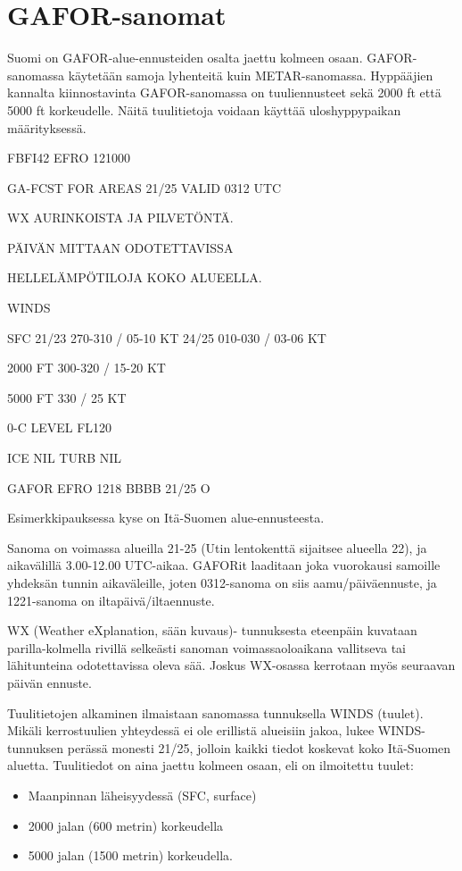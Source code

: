 \section{ GAFOR-sanomat }
\label{saaoppi-gafor-sanomat}


Suomi on GAFOR-alue-ennusteiden osalta jaettu kolmeen osaan. GAFOR-sanomassa käytetään samoja lyhenteitä kuin METAR-sanomassa. Hyppääjien kannalta kiinnostavinta GAFOR-sanomassa on tuuliennusteet sekä 2000 ft että 5000 ft korkeudelle. Näitä tuulitietoja voidaan käyttää uloshyppypaikan määrityksessä. 


FBFI42 EFRO 121000 


GA-FCST FOR AREAS 21/25 VALID 0312 UTC 


WX AURINKOISTA JA PILVETÖNTÄ. 


PÄIVÄN MITTAAN ODOTETTAVISSA 


HELLELÄMPÖTILOJA KOKO ALUEELLA. 


WINDS 


SFC 21/23 270-310 / 05-10 KT 24/25 010-030 / 03-06 KT 


2000 FT 300-320 / 15-20 KT 


5000 FT 330 / 25 KT 


0-C LEVEL FL120 


ICE NIL TURB NIL 


GAFOR EFRO 1218 BBBB 21/25 O 


Esimerkkipauksessa kyse on Itä-Suomen alue-ennusteesta. 


Sanoma on voimassa alueilla 21-25 (Utin lentokenttä sijaitsee alueella 22), ja aikavälillä 3.00-12.00 UTC-aikaa. GAFORit laaditaan joka vuorokausi samoille yhdeksän tunnin aikaväleille, joten 0312-sanoma on siis aamu/päiväennuste, ja 1221-sanoma on iltapäivä/iltaennuste. 


WX (Weather eXplanation, sään kuvaus)- tunnuksesta eteenpäin kuvataan parilla-kolmella rivillä selkeästi sanoman voimassaoloaikana vallitseva tai lähitunteina odotettavissa oleva sää. Joskus WX-osassa kerrotaan myös seuraavan päivän ennuste. 


Tuulitietojen alkaminen ilmaistaan sanomassa tunnuksella WINDS (tuulet). Mikäli kerrostuulien yhteydessä ei ole erillistä alueisiin jakoa, lukee WINDS-tunnuksen perässä monesti 21/25, jolloin kaikki tiedot koskevat koko Itä-Suomen aluetta. Tuulitiedot on aina jaettu kolmeen osaan, eli on ilmoitettu tuulet: 

\begin{itemize}
\item  Maanpinnan läheisyydessä (SFC, surface)  
\item  2000 jalan (600 metrin) korkeudella   
\item  5000 jalan (1500 metrin) korkeudella.  
\end{itemize}

